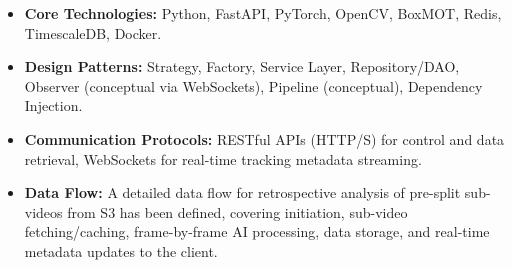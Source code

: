 \begin{itemize}
    \item \textbf{Core Technologies:} Python, FastAPI, PyTorch, OpenCV, BoxMOT, Redis, TimescaleDB, Docker.
    \item \textbf{Design Patterns:} Strategy, Factory, Service Layer, Repository/DAO, Observer (conceptual via WebSockets), Pipeline (conceptual), Dependency Injection.
    \item \textbf{Communication Protocols:} RESTful APIs (HTTP/S) for control and data retrieval, WebSockets for real-time tracking metadata streaming.
    \item \textbf{Data Flow:} A detailed data flow for retrospective analysis of pre-split sub-videos from S3 has been defined, covering initiation, sub-video fetching/caching, frame-by-frame AI processing, data storage, and real-time metadata updates to the client.
\end{itemize}


